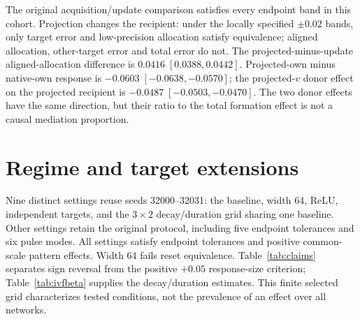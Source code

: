 The original acquisition/update comparison satisfies every endpoint band in this cohort. Projection changes the recipient: under the locally specified $\pm0.02$ bands, only target error and low-precision allocation satisfy equivalence; aligned allocation, other-target error and total error do not. The projected-minus-update aligned-allocation difference is $0.0416\;[0.0388,0.0442]$. Projected-own minus native-own response is $-0.0603\;[-0.0638,-0.0570]$; the projected-$v$ donor effect on the projected recipient is $-0.0487\;[-0.0503,-0.0470]$. The two donor effects have the same direction, but their ratio to the total formation effect is not a causal mediation proportion.

\section{Regime and target extensions}
\label{app:extension}
Nine distinct settings reuse seeds 32000--32031: the baseline, width 64, ReLU, independent targets, and the $3\times2$ decay/duration grid sharing one baseline. Other settings retain the original protocol, including five endpoint tolerances and six pulse modes. All settings satisfy endpoint tolerances and positive common-scale pattern effects. Width 64 fails reset equivalence. Table~\ref{tab:claims} separates sign reversal from the positive $+0.05$ response-size criterion; Table~\ref{tab:ivfbeta} supplies the decay/duration estimates. This finite selected grid characterizes tested conditions, not the prevalence of an effect over all networks.


